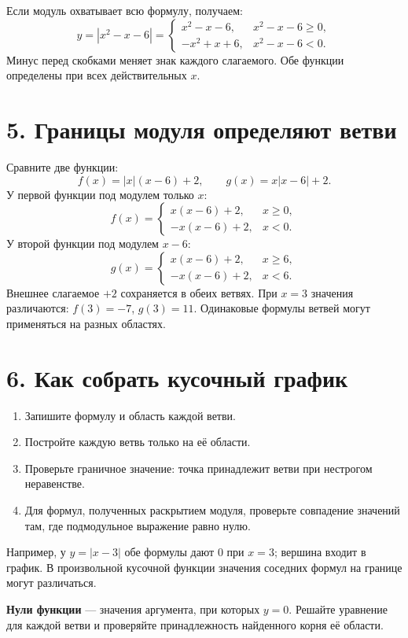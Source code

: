 \documentclass[a4paper,12pt]{article}
\newcommand{\topic}[1]{\section*{\color{darkaccent}#1}}
\newcommand{\key}[1]{\textbf{\color{darkaccent}#1}}
\begin{document}
Если модуль охватывает всю формулу, получаем:
\[
y=|x^2-x-6|=\begin{cases}x^2-x-6,&x^2-x-6\ge0,\\-x^2+x+6,&x^2-x-6<0.\end{cases}
\]
Минус перед скобками меняет знак каждого слагаемого. Обе функции определены при всех действительных $x$.
\clearpage
\topic{5. Границы модуля определяют ветви}
Сравните две функции:
\[
f(x)=|x|(x-6)+2,\qquad g(x)=x|x-6|+2.
\]
У первой функции под модулем только $x$:
\[
f(x)=\begin{cases}x(x-6)+2,&x\ge0,\\-x(x-6)+2,&x<0.\end{cases}
\]
У второй функции под модулем $x-6$:
\[
g(x)=\begin{cases}x(x-6)+2,&x\ge6,\\-x(x-6)+2,&x<6.\end{cases}
\]
Внешнее слагаемое $+2$ сохраняется в обеих ветвях. При $x=3$ значения различаются: $f(3)=-7$, $g(3)=11$. Одинаковые формулы ветвей могут применяться на разных областях.

\topic{6. Как собрать кусочный график}
\begin{enumerate}[itemsep=3pt]
\item Запишите формулу и область каждой ветви.
\item Постройте каждую ветвь только на её области.
\item Проверьте граничное значение: точка принадлежит ветви при нестрогом неравенстве.
\item Для формул, полученных раскрытием модуля, проверьте совпадение значений там, где подмодульное выражение равно нулю.
\end{enumerate}
Например, у $y=|x-3|$ обе формулы дают $0$ при $x=3$; вершина входит в график. В произвольной кусочной функции значения соседних формул на границе могут различаться.

\key{Нули функции} — значения аргумента, при которых $y=0$. Решайте уравнение для каждой ветви и проверяйте принадлежность найденного корня её области.
\end{document}
